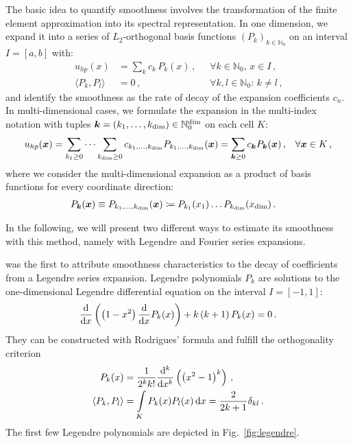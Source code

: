 The basic idea to quantify smoothness involves the transformation of the finite element approximation into its spectral representation. In one dimension, we expand it into a series of $L_2$-orthogonal basis functions $(P_k)_{k\in\mathbb{N}_0}$ on an interval $I = [a,b]$ with:
\begin{align}
u_{hp}(x) &= \sum\limits_{k} c_k \, P_k(x) \,\text{,} && \forall k \in \mathbb{N}_0 \text{, } x \in I \,\text{,} \\
\langle P_k, P_l \rangle &= 0 \,\text{,} && \forall k,l \in \mathbb{N}_0 \text{: } k \neq l \,\text{,}
\end{align}
and identify the smoothness as the rate of decay of the expansion coefficients $c_n$. In multi-dimensional cases, we formulate the expansion in the multi-index notation with tuples $\tuple{k} = (k_1, \dots, k_\text{dim}) \in \mathbb{N}_0^\text{dim}$ on each cell $K$:
\begin{align}
u_{hp}(\vec{x}) &= \sum\limits_{k_1 \geq 0} \dots \sum\limits_{k_\text{dim} \geq 0} c_{k_1, \dots, k_{\text{dim}}} P_{k_1, \dots, k_{\text{dim}}}(\vec{x}) = \sum_{\tuple{k} \geq 0} c_\tuple{k} P_\tuple{k}(\vec{x}) \,\text{,}  & \forall \vec{x} \in K \,\text{,}
\end{align}
where we consider the multi-dimensional expansion as a product of basis functions for every coordinate direction:
\begin{align}
\label{eq:spectral_multi} P_{\tuple{k}}(\vec{x}) \equiv P_{k_1, \dots, k_{\text{dim}}}(\vec{x}) &\coloneqq P_{k_1}(x_1) \dots P_{k_\text{dim}}(x_\text{dim}) \,\text{.}
\end{align}

In the following, we will present two different ways to estimate its smoothness with this method, namely with Legendre and Fourier series expansions.

\textcite{mavriplis1994} was the first to attribute smoothness characteristics to the decay of coefficients from a Legendre series expansion. Legendre polynomials $P_k$ are solutions to the one-dimensional Legendre differential equation on the interval $I = [-1,1]$:
\begin{align}
\frac{\mathop{}\!\mathrm{d}}{\mathop{}\!\mathrm{d}x} \left(\left(1-x^{2}\right) \frac{\mathop{}\!\mathrm{d}}{\mathop{}\!\mathrm{d}x} P_k(x)\right)+ k \left(k+1\right) P_k(x)=0 \,\text{.}
\end{align}
They can be constructed with Rodrigues' formula and fulfill the orthogonality criterion
\begin{align}
P_k(x) &= \frac{1}{2^k k!} \frac{\mathop{}\!\mathrm{d}^k}{\mathop{}\!\mathrm{d}x^k} \left( \left(x^2 - 1\right)^k \right) \,\text{,} \\
\label{eq:legendre_orthogonal} \langle P_k, P_l\rangle &= \int\limits_K P_k(x) P_l(x) \mathop{}\!\mathrm{d}x = \frac{2}{2 k+1} \delta_{k l} \,\text{.}
\end{align}
The first few Legendre polynomials are depicted in Fig.~\ref{fig:legendre}. \textcite{dealiilegendre}


